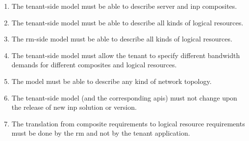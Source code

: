 \begin{enumerate}[
    label=\textbf{FR\arabic*},
    leftmargin=*,
    labelindent=1em
]
    \item \label{requirements:model:tenant:composites}
    The tenant-side model must be able to describe server and \gls{inp} composites.
    
    \item \label{requirements:model:tenant:logical}
    The tenant-side model must be able to describe all kinds of logical resources.
    
    \item \label{requirements:model:rm:logical}
    The \gls{rm}-side model must be able to describe all kinds of logical resources.

    \item \label{requirements:model:bandwidth}
    The tenant-side model must allow the tenant to specify different bandwidth demands for different composites and logical resources.
    
    \item \label{requirements:model:topology}
    The model must be able to describe any kind of network topology.

    \item \label{requirements:model:invariance}
    The tenant-side model (and the corresponding \glspl{api}) must not change upon the release of new \gls{inp} solution or version.
    
    \item \label{requirements:model:translation}
    The translation from composite requirements to logical resource requirements must be done by the \gls{rm} and not by the tenant application.
\end{enumerate}